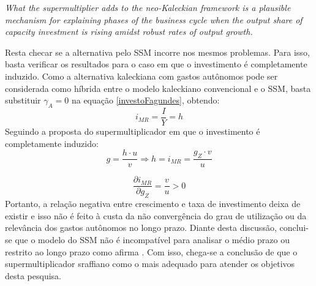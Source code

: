 \begin{citacao}
	\textit{What the supermultiplier adds to the neo-Kaleckian framework is a plausible mechanism for explaining phases
	of the business cycle when the output share of capacity investment is rising amidst robust rates of output growth.} \cite[p.~9]{fiebiger_trend_2017}
\end{citacao}

Resta checar se a alternativa pelo SSM incorre nos mesmos problemas. Para isso, basta verificar os resultados para o caso em que o investimento é completamente induzido. Como a alternativa kaleckiana com gastos autônomos pode ser considerada como híbrida entre o modelo kaleckiano convencional e o SSM, basta substituir $\gamma_A = 0$ na equação \ref{investoFagundes}, obtendo:
$$
i_{MR} = \frac{I}{Y} =  h
$$
Seguindo a proposta do supermultiplicador em que o investimento é completamente induzido:
$$
g = \frac{h\cdot u}{v} \Rightarrow h = i_{MR} = \frac{g_Z\cdot v}{u}
$$

$$
\frac{\partial i_{MR}}{\partial g_Z} = \frac{v}{u} > 0
$$
Portanto, a relação negativa entre crescimento e taxa de investimento deixa de existir e isso não é feito à custa da não convergência do grau de utilização ou da relevância dos gastos autônomos no longo prazo. 
Diante desta discussão, conclui-se que o modelo do SSM não é incompatível para analisar o médio prazo ou restrito ao longo prazo como afirma \textcite{nikiforos_comments_2018}. Com isso, chega-se a conclusão de que o supermultiplicador sraffiano como o mais adequado para atender os objetivos desta pesquisa. 






